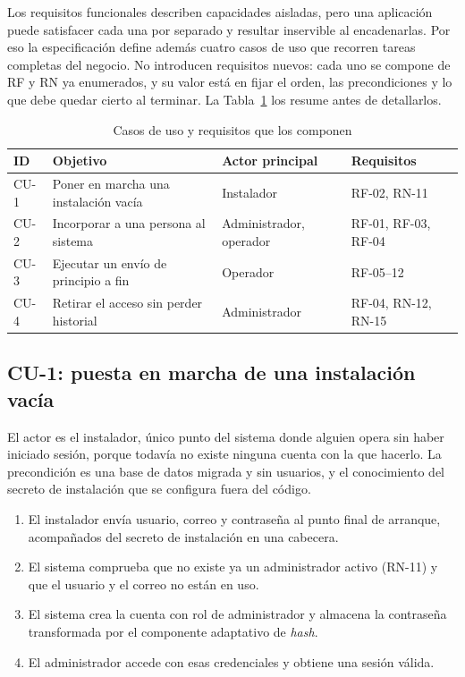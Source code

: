 Los requisitos funcionales describen capacidades aisladas, pero una aplicación puede satisfacer cada una por separado y resultar inservible al encadenarlas. Por eso la especificación define además cuatro casos de uso que recorren tareas completas del negocio. No introducen requisitos nuevos: cada uno se compone de RF y RN ya enumerados, y su valor está en fijar el orden, las precondiciones y lo que debe quedar cierto al terminar. La Tabla~\ref{tab:casos-uso} los resume antes de detallarlos.

\begin{table}[htbp]
\centering
\setlength{\tabcolsep}{8pt}
\caption{Casos de uso y requisitos que los componen}
\label{tab:casos-uso}
\begin{tabular}{@{}p{0.9cm}p{5.0cm}p{2.6cm}p{3.4cm}@{}}
\hline
ID & Objetivo & Actor principal & Requisitos \\
\hline
CU-1 & Poner en marcha una instalación vacía & Instalador & RF-02, RN-11 \\
CU-2 & Incorporar a una persona al sistema & Administrador, operador & RF-01, RF-03, RF-04 \\
CU-3 & Ejecutar un envío de principio a fin & Operador & RF-05--12 \\
CU-4 & Retirar el acceso sin perder historial & Administrador & RF-04, RN-12, RN-15 \\
\hline
\end{tabular}
\end{table}

\subsection*{CU-1: puesta en marcha de una instalación vacía}

El actor es el instalador, único punto del sistema donde alguien opera sin haber iniciado sesión, porque todavía no existe ninguna cuenta con la que hacerlo. La precondición es una base de datos migrada y sin usuarios, y el conocimiento del secreto de instalación que se configura fuera del código.

\begin{enumerate}
  \item El instalador envía usuario, correo y contraseña al punto final de arranque, acompañados del secreto de instalación en una cabecera.
  \item El sistema comprueba que no existe ya un administrador activo (RN-11) y que el usuario y el correo no están en uso.
  \item El sistema crea la cuenta con rol de administrador y almacena la contraseña transformada por el componente adaptativo de \emph{hash}.
  \item El administrador accede con esas credenciales y obtiene una sesión válida.
\end{enumerate}

